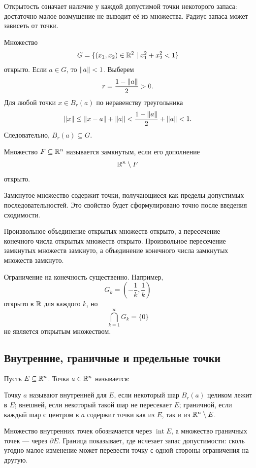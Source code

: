 Открытость означает наличие у каждой допустимой точки некоторого запаса: достаточно малое возмущение не выводит её из множества. Радиус запаса может зависеть от точки.

\begin{example}
Множество
\[
G=
\{(x_1,x_2)\in\mathbb{R}^2\mid x_1^2+x_2^2<1\}
\]
открыто. Если \(a\in G\), то \(\lVert a\rVert<1\). Выберем
\[
r=\frac{1-\lVert a\rVert}{2}>0.
\]
Для любой точки \(x\in B_r(a)\) по неравенству треугольника
\[
\lVert x\rVert
\leq
\lVert x-a\rVert+\lVert a\rVert
<
\frac{1-\lVert a\rVert}{2}+\lVert a\rVert
<1.
\]
Следовательно, \(B_r(a)\subseteq G\).
\end{example}

\begin{definition}
Множество \(F\subseteq\mathbb{R}^n\) называется замкнутым, если его дополнение
\[
\mathbb{R}^n\setminus F
\]
открыто.
\end{definition}

Замкнутое множество содержит точки, получающиеся как пределы допустимых последовательностей. Это свойство будет сформулировано точно после введения сходимости.

\begin{claim}
Произвольное объединение открытых множеств открыто, а пересечение конечного числа открытых множеств открыто. Произвольное пересечение замкнутых множеств замкнуто, а объединение конечного числа замкнутых множеств замкнуто.
\end{claim}

Ограничение на конечность существенно. Например,
\[
G_k=\left(-\frac1k,\frac1k\right)
\]
открыто в \(\mathbb{R}\) для каждого \(k\), но
\[
\bigcap_{k=1}^{\infty}G_k=\{0\}
\]
не является открытым множеством.

\subsection{Внутренние, граничные и предельные точки}

\begin{definition}
Пусть \(E\subseteq\mathbb{R}^n\). Точка \(a\in\mathbb{R}^n\) называется:

Точку \(a\) называют внутренней для \(E\), если некоторый шар \(B_r(a)\) целиком лежит в \(E\); внешней, если некоторый такой шар не пересекает \(E\); граничной, если каждый шар с центром в \(a\) содержит точки как из \(E\), так и из \(\mathbb{R}^n\setminus E\).
\end{definition}

Множество внутренних точек обозначается через \(\operatorname{int}E\), а множество граничных точек --- через \(\partial E\). Граница показывает, где исчезает запас допустимости: сколь угодно малое изменение может перевести точку с одной стороны ограничения на другую.

